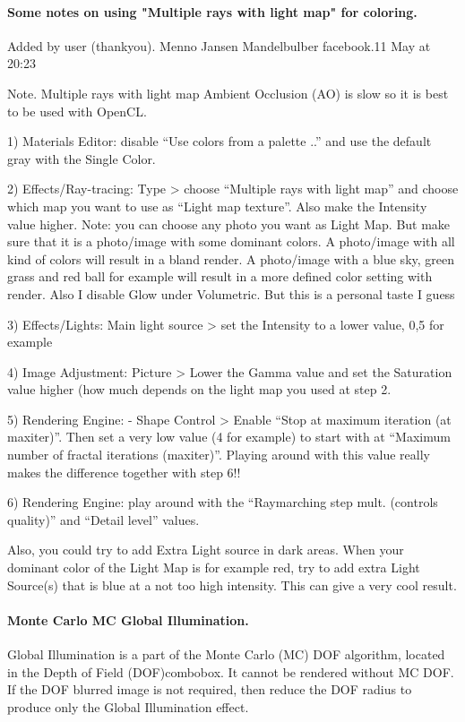 \paragraph{Some notes on using "Multiple rays with light map" for coloring.}
Added by user (thankyou).
Menno Jansen 
Mandelbulber facebook.11 May at 20:23

Note. Multiple rays with light map Ambient Occlusion (AO) is slow so it is best to be used with OpenCL.

1) Materials Editor: disable “Use colors from a palette ..” and use the default gray with the Single Color.

2) Effects/Ray-tracing: Type > choose “Multiple rays with light map” and choose which map you want to use as “Light map texture”. Also make the Intensity value higher.
Note: you can choose any photo you want as Light Map. But make sure that it is a photo/image with some dominant colors. A photo/image with all kind of colors will result in a bland render. A photo/image with a blue sky, green grass and red ball for example will result in a more defined color setting with render.
Also I disable Glow under Volumetric. But this is a personal taste I guess

3) Effects/Lights: Main light source > set the Intensity to a lower value, 0,5 for example

4) Image Adjustment: Picture > Lower the Gamma value and set the Saturation value higher (how much depends on the light map you used at step 2.

5) Rendering Engine: - Shape Control > Enable “Stop at maximum iteration (at maxiter)”. Then set a very low value (4 for example) to start with at “Maximum number of fractal iterations (maxiter)”. Playing around with this value really makes the difference together with step 6!!

6) Rendering Engine: play around with the “Raymarching step mult. (controls quality)” and “Detail level” values.

Also, you could try to add Extra Light source in dark areas. When your dominant color of the Light Map is for example red, try to add extra Light Source(s) that is blue at a not too high intensity. This can give a very cool result.


\paragraph{Monte Carlo MC Global Illumination.}
Global Illumination is a part of the Monte Carlo (MC) DOF algorithm, located in the Depth of Field (DOF)combobox. It cannot be rendered without MC DOF. If the DOF blurred image is not required, then reduce the DOF radius to produce only the Global Illumination effect.

